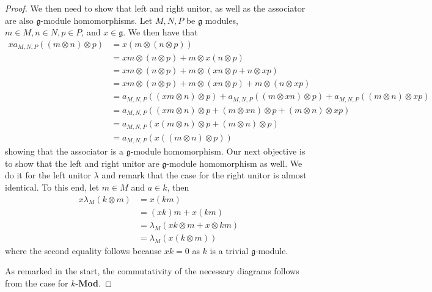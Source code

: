 \begin{proof}
  We then need to show that left and right unitor, as well as the associator are also $ \mathfrak{g} $-module homomorphisms. Let $ M,N,P $ be $ \mathfrak{g} $ modules, $ m \in M, n \in N, p \in P $, and $ x \in \mathfrak{g} $. We then have that
  \begin{align*}
    xa_{M, N, P}((m \otimes n) \otimes p) &= x (m \otimes (n \otimes p)) \\
                                          &= xm \otimes (n \otimes p) + m \otimes x(n \otimes p) \\
                                          &= xm \otimes (n \otimes p) + m \otimes (xn \otimes p + n \otimes xp) \\
                                          &= xm \otimes (n \otimes p) + m \otimes (xn \otimes p) + m \otimes (n \otimes xp) \\
                                          &= a_{M, N, P}((xm \otimes n) \otimes p) + a_{M, N, P}((m \otimes xn) \otimes p) + a_{M, N, P}((m \otimes n) \otimes xp)\\
                                          &= a_{M, N, P}((xm \otimes n) \otimes p + (m \otimes xn) \otimes p + (m \otimes n) \otimes xp) \\
                                          &= a_{M, N, P}(x(m \otimes n) \otimes p + (m \otimes n) \otimes p) \\
                                          &= a_{M, N, P}(x((m \otimes n) \otimes p))
  \end{align*}
  showing that the associator is a $ \mathfrak{g} $-module homomorphism. Our next objective is to show that the left and right unitor are $ \mathfrak{g} $-module homomorphism as well. We do it for the left unitor $ \lambda $ and remark that the case for the right unitor is almost identical. To this end, let $ m \in M $ and $ a \in k $, then
  \begin{align*}
    x\lambda_{M}(k \otimes m) &= x(km) \\
                              &= (xk)m + x(km) \\
                              &= \lambda_{M}(xk \otimes m + x \otimes km) \\
                              &= \lambda_{M}(x(k \otimes m))
  \end{align*}
  where the second equality follows because $ xk = 0 $ as $ k $ is a trivial $ \mathfrak{g} $-module.

  As remarked in the start, the commutativity of the necessary diagrams follows from the case for $ k $-\textbf{Mod}.
\end{proof}

